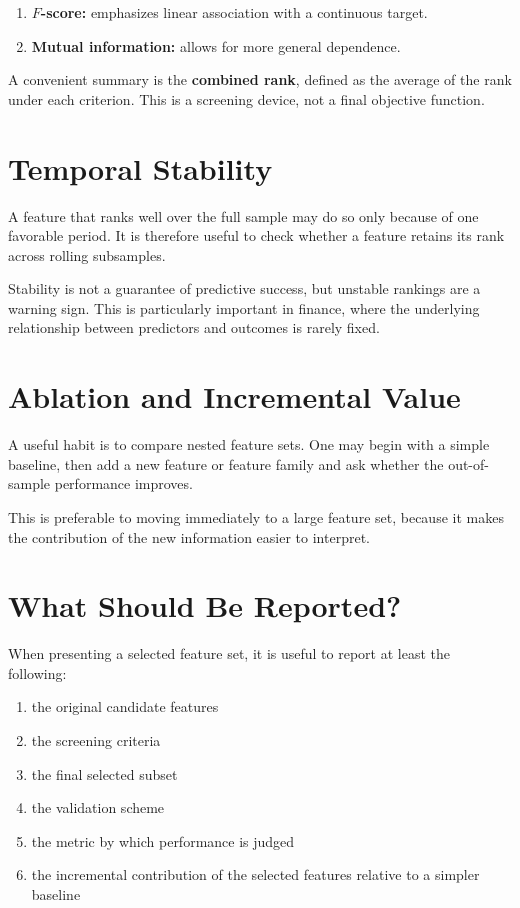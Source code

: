 \documentclass[11pt]{article}
\begin{document}
\begin{enumerate}
  \item \textbf{$F$-score:} emphasizes linear association with a continuous target.
  \item \textbf{Mutual information:} allows for more general dependence.
\end{enumerate}

A convenient summary is the \textbf{combined rank}, defined as the average of
the rank under each criterion. This is a screening device, not a final
objective function.

\newpage

\section*{Temporal Stability}

A feature that ranks well over the full sample may do so only because of one
favorable period. It is therefore useful to check whether a feature retains its
rank across rolling subsamples.

Stability is not a guarantee of predictive success, but unstable rankings are a
warning sign. This is particularly important in finance, where the underlying
relationship between predictors and outcomes is rarely fixed.

\section*{Ablation and Incremental Value}

A useful habit is to compare nested feature sets. One may begin with a simple
baseline, then add a new feature or feature family and ask whether the
out-of-sample performance improves.

This is preferable to moving immediately to a large feature set, because it
makes the contribution of the new information easier to interpret.

\newpage

\section*{What Should Be Reported?}

When presenting a selected feature set, it is useful to report at least the
following:

\begin{enumerate}
  \item the original candidate features
  \item the screening criteria
  \item the final selected subset
  \item the validation scheme
  \item the metric by which performance is judged
  \item the incremental contribution of the selected features relative to a simpler baseline
\end{enumerate}
\end{document}

